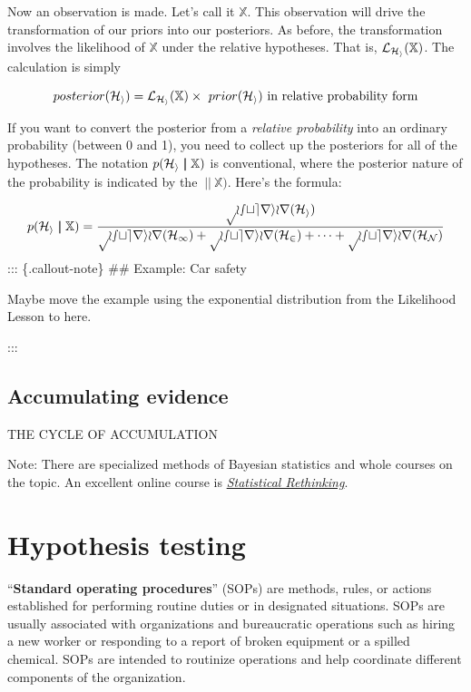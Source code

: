 \documentclass[
  letterpaper,
  DIV=11,
  numbers=noendperiod,
  oneside]{scrartcl}
\begin{document}
Now an observation is made. Let's call it \(\mathbb{X}\). This
observation will drive the transformation of our priors into our
posteriors. As before, the transformation involves the likelihood of
\(\mathbb{X}\) under the relative hypotheses. That is,
\({\cal L}_{\cal H_i}(\mathbb{X})\). The calculation is simply

\[posterior({\cal H_i}) = {\cal L}_{\cal H_i}(\mathbb{X}) \times\ prior({\cal H_i}) \ \text{in relative probability form}\]

If you want to convert the posterior from a \emph{relative probability}
into an ordinary probability (between 0 and 1), you need to collect up
the posteriors for all of the hypotheses. The notation
\(p(\cal H_i\ |\!\!|\  \mathbb X)\) is conventional, where the posterior
nature of the probability is indicated by the \(\ |\!\!|\  \mathbb X)\).
Here's the formula:

\[p(\cal H_i\ |\!\!|\  \mathbb X) = \frac{posterior(\cal H_i)}{posterior(\cal H_1) + posterior(\cal H_2) + \cdots + posterior(\cal H_N)}\]
::: \{.callout-note\} \#\# Example: Car safety

Maybe move the example using the exponential distribution from the
Likelihood Lesson to here.

:::

\subsection{Accumulating evidence}\label{accumulating-evidence}

THE CYCLE OF ACCUMULATION

Note: There are specialized methods of Bayesian statistics and whole
courses on the topic. An excellent online course is
\href{https://www.youtube.com/channel/UCNJK6_DZvcMqNSzQdEkzvzA}{\emph{Statistical
Rethinking}}.

\newpage

\section{Hypothesis testing}\label{sec-NHT}

``\textbf{Standard operating procedures}'' (SOPs) are methods, rules, or
actions established for performing routine duties or in designated
situations. SOPs are usually associated with organizations and
bureaucratic operations such as hiring a new worker or responding to a
report of broken equipment or a spilled chemical. SOPs are intended to
routinize operations and help coordinate different components of the
organization.
\end{document}

